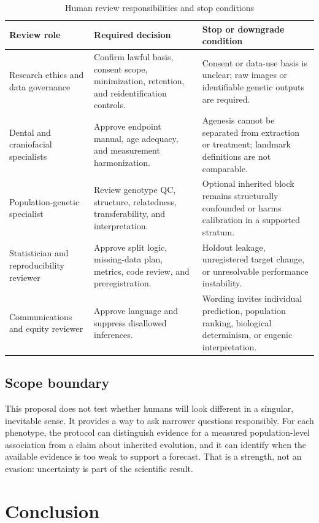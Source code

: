 \documentclass[conference]{IEEEtran}
\begin{document}
\begin{table}[t]
\caption{Human review responsibilities and stop conditions}
\label{tab:review}
\centering
\footnotesize
\begin{tabular}{p{}p{}p{}}
\toprule
Review role & Required decision & Stop or downgrade condition \\
\midrule
Research ethics and data governance & Confirm lawful basis, consent scope, minimization, retention, and reidentification controls. & Consent or data-use basis is unclear; raw images or identifiable genetic outputs are required. \\
Dental and craniofacial specialists & Approve endpoint manual, age adequacy, and measurement harmonization. & Agenesis cannot be separated from extraction or treatment; landmark definitions are not comparable. \\
Population-genetic specialist & Review genotype QC, structure, relatedness, transferability, and interpretation. & Optional inherited block remains structurally confounded or harms calibration in a supported stratum. \\
Statistician and reproducibility reviewer & Approve split logic, missing-data plan, metrics, code review, and preregistration. & Holdout leakage, unregistered target change, or unresolvable performance instability. \\
Communications and equity reviewer & Approve language and suppress disallowed inferences. & Wording invites individual prediction, population ranking, biological determinism, or eugenic interpretation. \\
\bottomrule
\end{tabular}
\end{table}

\subsection{Scope boundary}

This proposal does not test whether humans will look different in a singular,
inevitable sense. It provides a way to ask narrower questions responsibly.
For each phenotype, the protocol can distinguish evidence for a measured
population-level association from a claim about inherited evolution, and it
can identify when the available evidence is too weak to support a forecast.
That is a strength, not an evasion: uncertainty is part of the scientific
result.

\section{Conclusion}
\end{document}

